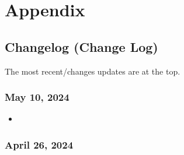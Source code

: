 \documentclass[12pt]{article}
\begin{document}
    \section{Appendix}
    \label{sec:appendix}

    \subsection{Changelog (Change Log)}
    \label{subsec:change}

    The most recent/changes updates are at the top.

    \subsubsection{May 10, 2024}

    

    \begin{itemize}
        \item 
    \end{itemize}

    \subsubsection{April 26, 2024}
\end{document}
